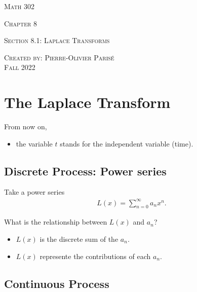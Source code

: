 \documentclass[12pt,a4paper]{article}
\begin{document}
\thispagestyle{empty}

\begin{center}
\vspace*{2.5cm}

{\Huge \textsc{Math 302}}

\vspace*{2cm}

{\LARGE \textsc{Chapter 8}} 

\vspace*{0.75cm}

\noindent\textsc{Section 8.1: Laplace Transforms}

\vspace*{0.75cm}

\tableofcontents

\vfill

\noindent \textsc{Created by: Pierre-Olivier Paris{\'e}} \\
\textsc{Fall 2022}
\end{center}

\newpage

\section{The Laplace Transform}
From now on,
	\begin{itemize}
	\item the variable $t$ stands for the independent variable (time).
	\end{itemize}
\subsection{Discrete Process: Power series}

\begin{notes}
Take a power series
	\begin{align*}
	L(x) = \sum_{n = 0}^\infty a_n x^n .
	\end{align*}

What is the relationship between $L (x)$ and $a_n$?
	\begin{itemize}
	\item $L(x)$ is the discrete sum of the $a_n$.
	\item $L(x)$ represente the contributions of each $a_n$.
	\end{itemize}
\end{notes}

\vspace*{8cm}
	
\subsection{Continuous Process}
\end{document}
